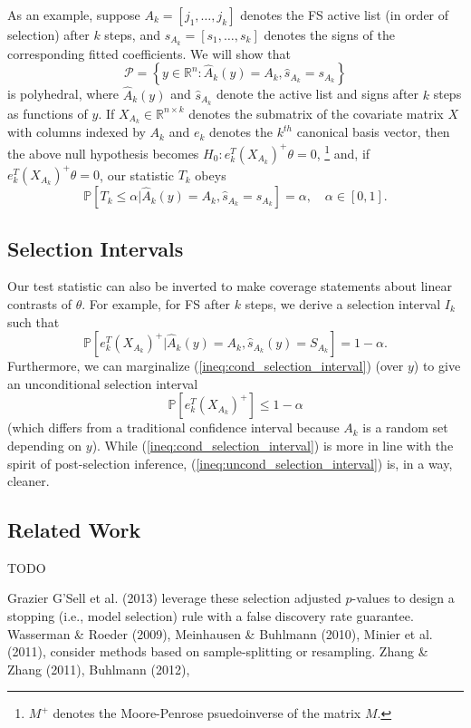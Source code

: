 \documentclass{article}
\newcommand{\R}{\mathbb{R}}                         %
\newcommand{\pr}{\mathbb{P}}                        %
\renewcommand{\hat}{\widehat}
\newcommand{\poly}{\mathcal{P}}
\begin{document}
As an example, suppose $A_k = [j_1,\dots,j_k]$ denotes the FS active list (in
order of selection) after $k$ steps, and $s_{A_k} = [s_1,\dots,s_k]$ denotes
the signs of the corresponding fitted coefficients. We will show that
\[\poly
    = \left\{ y \in \R^n : \hat A_k(y) = A_k,
                                            \hat s_{A_k} = s_{A_k} \right\}\]
is polyhedral, where $\hat A_k(y)$ and $\hat s_{A_k}$ denote the active list
and signs after $k$ steps as functions of $y$. If $X_{A_k} \in \R^{n \times k}$
denotes the submatrix of the covariate matrix $X$ with columns indexed by $A_k$
and $e_k$ denotes the $k^{th}$ canonical basis vector, then the above null
hypothesis becomes $H_0 : e_k^T (X_{A_k})^+ \theta = 0$,
\footnote{$M^+$ denotes the Moore-Penrose psuedoinverse of the matrix $M$.}
and, if $e_k^T (X_{A_k})^+ \theta = 0$, our statistic $T_k$ obeys
\[\pr\left[ T_k \leq \alpha | \hat A_k(y) = A_k, \hat s_{A_k} = s_{A_k} \right]
    = \alpha, \quad \alpha \in [0,1].\]

\subsection{Selection Intervals}
Our test statistic can also be inverted to make coverage statements about
linear contrasts of $\theta$. For example, for FS after $k$ steps, we derive a
selection interval $I_k$ such that
\begin{equation}
\pr\left[ e_k^T (X_{A_k})^+ | \hat A_k(y) = A_k,
                                            \hat s_{A_k}(y) = S_{A_k} \right]
    = 1 - \alpha.
\label{ineq:cond_selection_interval}
\end{equation}
Furthermore, we can marginalize (\ref{ineq:cond_selection_interval}) (over $y$)
to give an unconditional selection interval
\begin{equation}
\pr\left[ e_k^T (X_{A_k})^+ \right] \leq 1 - \alpha
\label{ineq:uncond_selection_interval}
\end{equation}
(which differs from a traditional confidence interval because $A_k$ is a random
set depending on $y$). While (\ref{ineq:cond_selection_interval}) is more in
line with the spirit of post-selection inference,
(\ref{ineq:uncond_selection_interval}) is, in a way, cleaner.

\subsection{Related Work}
TODO %

Grazier G'Sell et al. (2013) leverage these selection adjusted $p$-values to
design a stopping (i.e., model selection) rule with a false discovery rate
guarantee.
Wasserman \& Roeder (2009), Meinhausen \& Buhlmann (2010), Minier et al.
(2011), consider methods based on sample-splitting or resampling. Zhang \&
Zhang (2011), Buhlmann (2012), 
\end{document}
